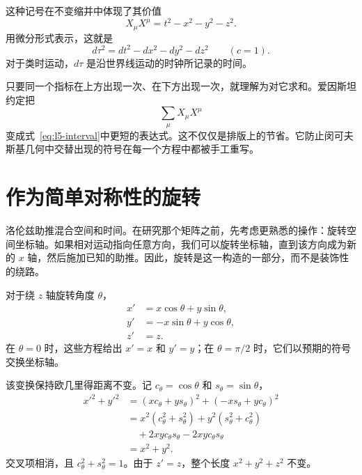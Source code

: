 这种记号在不变缩并中体现了其价值
\begin{equation}
X_\mu X^\mu=t^2-x^2-y^2-z^2.
\label{eq:l5-interval}
\end{equation}
用微分形式表示，这就是
\begin{equation}
d\tau^2=dt^2-dx^2-dy^2-dz^2
\qquad (c=1).
\label{eq:l5-proper-time}
\end{equation}
对于类时运动，\(d\tau\) 是沿世界线运动的时钟所记录的时间。

只要同一个指标在上方出现一次、在下方出现一次，就理解为对它求和。爱因斯坦约定把
\begin{equation}
\sum_{\mu}X_\mu X^\mu
\end{equation}
变成式~\eqref{eq:l5-interval}中更短的表达式。这不仅仅是排版上的节省。它防止闵可夫斯基几何中交替出现的符号在每一个方程中都被手工重写。

\begin{classroomqa}
\end{classroomqa}

\section{作为简单对称性的旋转}

洛伦兹助推混合空间和时间。在研究那个矩阵之前，先考虑更熟悉的操作：旋转空间坐标轴。如果相对运动指向任意方向，我们可以旋转坐标轴，直到该方向成为新的 \(x\) 轴，然后施加已知的助推。因此，旋转是这一构造的一部分，而不是装饰性的绕路。

对于绕 \(z\) 轴旋转角度 \(\theta\)，
\begin{align}
x'&=x\cos\theta+y\sin\theta,\nonumber\\
y'&=-x\sin\theta+y\cos\theta,\label{eq:l5-rotation}\\
z'&=z.\nonumber
\end{align}
在 \(\theta=0\) 时，这些方程给出 \(x'=x\) 和 \(y'=y\)；在 \(\theta=\pi/2\) 时，它们以预期的符号交换坐标轴。

该变换保持欧几里得距离不变。记
\(c_\theta=\cos\theta\) 和 \(s_\theta=\sin\theta\)，
\begin{align}
x'^2+y'^2
&=(xc_\theta+ys_\theta)^2+(-xs_\theta+yc_\theta)^2\nonumber\\
&=x^2(c_\theta^2+s_\theta^2)
  +y^2(s_\theta^2+c_\theta^2)\nonumber\\
&\quad+2xyc_\theta s_\theta-2xyc_\theta s_\theta\nonumber\\
&=x^2+y^2.
\end{align}
交叉项相消，且 \(c_\theta^2+s_\theta^2=1\)。由于 \(z'=z\)，整个长度 \(x^2+y^2+z^2\) 不变。

